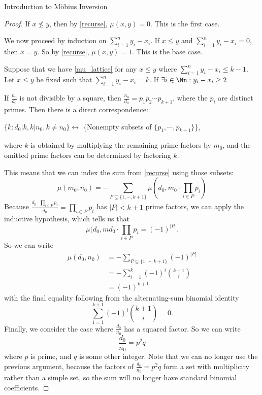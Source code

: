 \documentclass[12pt]{pom_thesis}
\begin{document}
\begin{chapter}{Introduction to M\"obius Inversion}
\begin{proof} %
If $x \nleq y$, then by \ref{recurse}, $\mu(x,y) = 0$. This is the first case.

We now proceed by induction on $\sum_{i=1}^ny_i-x_i$. If $x \leq y$ and $\sum_{i=1}^ny_i-x_i = 0$, then $x = y$. So by \ref{recurse}, $\mu(x,y) = 1$. This is the base case.

Suppose that we have \ref{mu_lattice} for any $x \leq y$ where $\sum_{i=1}^ny_i-x_i \leq k-1$. Let $x \leq y$ be fixed such that $\sum_{i=1}^ny_i-x_i =k$. If $\exists i \in \Nn: y_i-x_i \geq 2$



If $\frac{n_0}{d_0}$ is not divisible by a square, then $\frac{n_0}{d_0} = p_1p_2\cdots p_{k+1}$, where the $p_i$ are distinct primes. Then there is a direct correspondence:
\begin{center}$\{k : d_0|k, k|n_0, k\neq n_0\} \leftrightarrow$ \{Nonempty subsets of $\{p_1,\cdots,p_{k+1}\}$\},\end{center}
where $k$ is obtained by multiplying the remaining prime factors by $m_0$, and the omitted prime factors can be determined by factoring $k$.

This means that we can index the sum from \ref{recurse} using those subsets:
\[
\mu(m_0, n_0) = -\sum_{P \subsetneq \{1,\cdots,k+1\}} \mu(d_0, m_0\cdot \prod_{i \in P}p_i )
\]
Because $\frac{d_0\cdot \prod_{i \in P}p_i}{d_0} = \prod_{i \in P}p_i$ has $|P| < k + 1$ prime factors, we can apply the inductive hypothesis, which tells us that 
\[
\mu(d_0, md_0\cdot \prod_{i \in P}p_i = (-1)^{|P|}.
\]
So we can write
\begin{align*}
\mu(d_0, n_0) &= -\sum_{P \subsetneq \{1,\cdots,k+1\}} (-1)^{|P|}\\
&= -\sum_{i = 1}^{k}(-1)^i{k+1 \choose i}\\
&= (-1)^{k+1}
\end{align*}
with the final equality following from the alternating-sum binomial identity
\[
\sum_{1=1}^{k+1}(-1)^i{k+1 \choose i} = 0.
\]
Finally, we consider the case where $\frac {d_0}{n_0}$ has a squared factor. So we can write 
\[
\frac {d_0}{n_0} = p^2q
\]
where $p$ is prime, and $q$ is some other integer. Note that we can no longer use the previous argument, because the factors of $\frac {d_0}{n_0} = p^2q$ form a set with multiplicity rather than a simple set, so the sum will no longer have standard binomial coefficients.


\end{proof}
\end{chapter}
\end{document}
